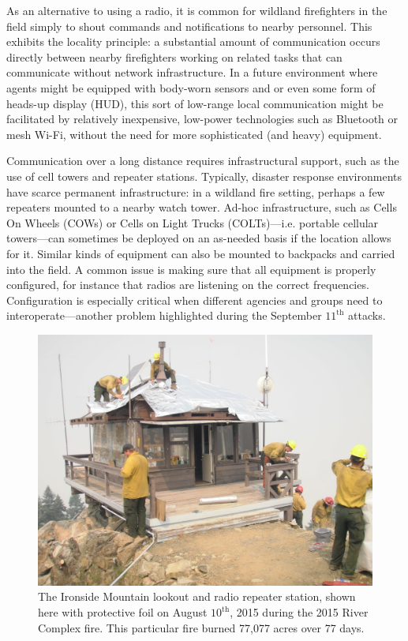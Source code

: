 \documentclass[]             %
{NASA}                       %
\theoremstyle{definition}
\begin{document}
As an alternative to using a radio, it is common for wildland
firefighters in the field simply to shout commands and notifications
to nearby personnel. This exhibits the locality principle: a
substantial amount of communication occurs directly between nearby
firefighters working on related tasks that can communicate without
network infrastructure. In a future environment where agents might be
equipped with body-worn sensors and or even some form of heads-up
display (HUD), this sort of low-range local communication might be
facilitated by relatively inexpensive, low-power technologies such as
Bluetooth or mesh Wi-Fi, without the need for more sophisticated (and
heavy) equipment.

Communication over a long distance requires infrastructural support,
such as the use of cell towers and repeater stations. Typically,
disaster response environments have scarce permanent infrastructure:
in a wildland fire setting, perhaps a few repeaters mounted to a
nearby watch tower. Ad-hoc infrastructure, such as Cells On Wheels
(COWs) or Cells on Light Trucks (COLTs)---i.e. portable cellular
towers---can sometimes be deployed on an as-needed basis if the
location allows for it. Similar kinds of equipment can also be mounted
to backpacks and carried into the field. A common issue is making sure
that all equipment is properly configured, for instance that radios
are listening on the correct frequencies. Configuration is especially
critical when different agencies and groups need to
interoperate---another problem highlighted during the September
$11^\textrm{th}$ attacks.

\begin{figure}[t]
  \centering
  \includegraphics[scale=0.085]{images/ironside.jpg}
  \caption{The Ironside Mountain lookout and radio repeater station,
    shown here with protective foil on August $10^\textrm{th}$, 2015
    during the 2015 River Complex fire. This particular fire burned
    77,077 acres over 77 days.}
  \label{fig:ironside}
\end{figure}
\end{document}
